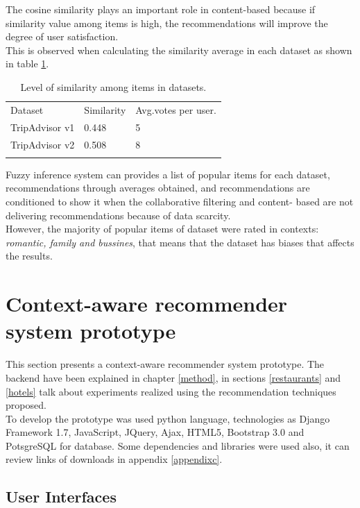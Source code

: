 The cosine similarity plays an important role in content-based because
if similarity value among items is high, the recommendations will
improve the degree of user satisfaction. \\ This is observed when
calculating the similarity average in each dataset as shown in table
\ref{tab:5}.
\begin{table}
\centering
\small
\captionsetup{font=footnotesize}
\caption{Level of similarity among items in datasets. }
\label{tab:5}      
\begin{tabular}{lll}
\hline\noalign{\smallskip}
Dataset  & Similarity  & Avg.votes per user. \\
\noalign{\smallskip}\hline\noalign{\smallskip}
TripAdvisor v1 & 0.448  & 5  \\
TripAdvisor v2 & 0.508  & 8  \\
\noalign{\smallskip}\hline
\end{tabular}
\end{table}
Fuzzy inference system can provides a list of popular items for each dataset,
recommendations through averages obtained, and recommendations are
conditioned to show it when the collaborative filtering and content-
based are not delivering recommendations because of data scarcity.\\ 
However, the majority of popular items of dataset were rated in contexts: 
\textit{romantic, family and bussines}, that means that the dataset has
biases that affects the results.


\section{Context-aware recommender system prototype} 
This section presents a context-aware recommender system prototype.
The backend have been explained in chapter \ref{method},  in sections
\ref{restaurants} and \ref{hotels} talk about experiments realized
using the recommendation techniques proposed. \\ To develop the prototype
was used python language, technologies as Django Framework 1.7,
JavaScript, JQuery, Ajax, HTML5, Bootstrap 3.0  and PotsgreSQL for database.
Some dependencies and libraries were used also, it can review links of
downloads in appendix \ref{appendixc}.

\subsection{User Interfaces}

